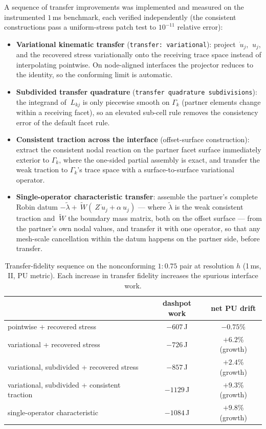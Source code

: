 \documentclass[11pt]{article}
\newcommand{\code}[1]{\texttt{#1}}
\begin{document}
A sequence of transfer improvements was implemented and measured on the
instrumented $1$\,ms benchmark, each verified independently (the consistent
constructions pass a uniform-stress patch test to $10^{-11}$ relative
error):

\begin{itemize}
\item \textbf{Variational kinematic transfer} (\code{transfer:
  variational}): project $\dot{~u}_j$, $~u_j$, and the recovered stress
  variationally onto the receiving trace space instead of interpolating
  pointwise. On node-aligned interfaces the projector reduces to the
  identity, so the conforming limit is automatic.
\item \textbf{Subdivided transfer quadrature} (\code{transfer quadrature
  subdivisions}): the integrand of $~L_{kj}$ is only piecewise smooth on
  $\Gamma_k$ (partner elements change within a receiving facet), so an
  elevated sub-cell rule removes the consistency error of the default facet
  rule.
\item \textbf{Consistent traction across the interface} (offset-surface
  construction): extract the consistent nodal reaction on the partner facet
  surface immediately exterior to $\Gamma_k$, where the one-sided partial
  assembly is exact, and transfer the weak traction to $\Gamma_k$'s trace
  space with a surface-to-surface variational operator.
\item \textbf{Single-operator characteristic transfer}: assemble the
  partner's complete Robin datum
  $-\tilde\lambda + \tilde{~W}(~Z\dot{~u}_j + \alpha ~u_j)$ --- where
  $\tilde\lambda$ is the weak consistent traction and $\tilde{~W}$ the
  boundary mass matrix, both on the offset surface --- from the partner's
  own nodal values, and transfer it with one operator, so that any
  mesh-scale cancellation within the datum happens on the partner side,
  before transfer.
\end{itemize}

\begin{table}[htbp]
\centering
\small
\caption{Transfer-fidelity sequence on the nonconforming $1{:}0.75$ pair
at resolution $h$ (1\,ms, II, PU metric). Each increase in transfer
fidelity increases the spurious interface work.}
\label{tab:fidelity-ladder}
\begin{tabular}{lcc}
\toprule
& dashpot work & net PU drift \\
\midrule
pointwise + recovered stress & $-607$\,J & $-0.75$\% \\
variational + recovered stress & $-726$\,J & $+6.2$\% (growth) \\
variational, subdivided + recovered stress & $-857$\,J & $+2.4$\% (growth) \\
variational, subdivided + consistent traction & $-1129$\,J & $+9.3$\% (growth) \\
single-operator characteristic & $-1084$\,J & $+9.8$\% (growth) \\
\bottomrule
\end{tabular}
\end{table}
\end{document}
